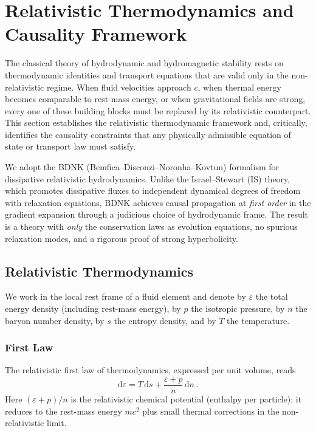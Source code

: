 
\section{Relativistic Thermodynamics and Causality Framework}
\label{sec:rel-thermo-framework}

The classical theory of hydrodynamic and hydromagnetic stability rests on
thermodynamic identities and transport equations that are valid only in
the non-relativistic regime.  When fluid velocities approach $c$, when
thermal energy becomes comparable to rest-mass energy, or when
gravitational fields are strong, every one of these building blocks must
be replaced by its relativistic counterpart.  This section establishes
the relativistic thermodynamic framework and, critically, identifies the
causality constraints that any physically admissible equation of state or
transport law must satisfy.

We adopt the BDNK (Bemfica--Disconzi--Noronha--Kovtun) formalism for
dissipative relativistic hydrodynamics.  Unlike the Israel--Stewart (IS)
theory, which promotes dissipative fluxes to independent dynamical
degrees of freedom with relaxation equations, BDNK achieves causal
propagation at \emph{first order} in the gradient expansion through a
judicious choice of hydrodynamic frame.  The result is a theory with
\emph{only} the conservation laws as evolution equations, no spurious
relaxation modes, and a rigorous proof of strong hyperbolicity.

\subsection{Relativistic Thermodynamics}
\label{subsec:rel-thermo}

We work in the local rest frame of a fluid element and denote by
$\varepsilon$ the total energy density (including rest-mass energy),
by $p$ the isotropic pressure, by $n$ the baryon number density, by
$s$ the entropy density, and by $T$ the temperature.

\subsubsection{First Law}
The relativistic first law of thermodynamics, expressed per unit
volume, reads
\begin{equation}
  \mathrm{d}\varepsilon
  = T\,\mathrm{d} s
    + \frac{\varepsilon + p}{n}\,\mathrm{d} n \,.
  \label{eq:rel-first-law}
\end{equation}
Here $(\varepsilon+p)/n$ is the relativistic chemical potential
(enthalpy per particle); it reduces to the rest-mass energy $m c^{2}$
plus small thermal corrections in the non-relativistic limit.

